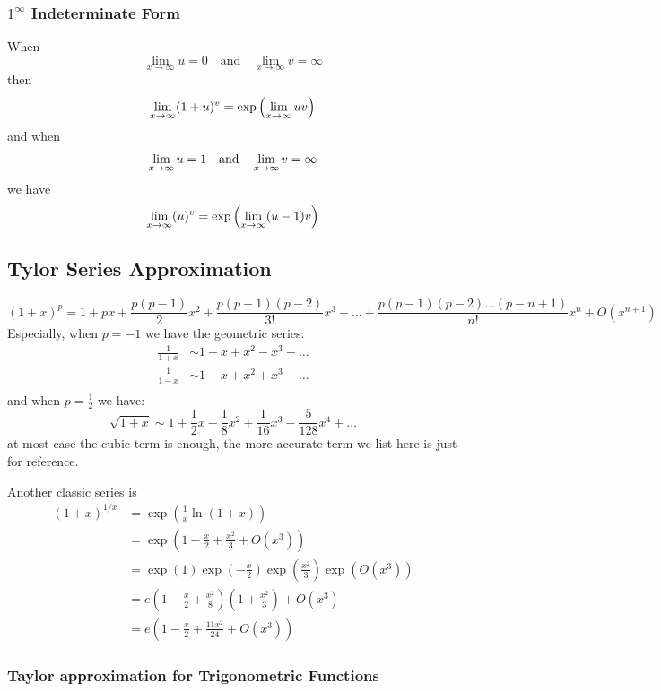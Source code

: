 \documentclass{overview}
\begin{document}
\subsubsection{$1^\infty$ Indeterminate Form}
When
 \[
	 \lim_{x \to \infty} u = 0 \quad \text{and} \quad
	 \lim_{x \to \infty} v = \infty
\] 
then
\[
	\lim_{x \to \infty}(1+u)^{v} = \exp\left({\lim_{x \to \infty} uv}\right)
\] 
and when
\[
	\lim_{x \to \infty} u = 1 \quad \text{and} \quad \lim_{x \to \infty} v = \infty
\] 
we have
\[
	\lim_{x \to \infty} (u)^{v} = \exp\left({\lim_{x \to \infty} (u-1)v}\right)
\] 
\subsection{Tylor Series Approximation}

\[
	(1+x)^{p} = 1 + px + \dfrac{p(p-1)}{2} x^2 + \dfrac{p(p-1)(p-2)}{3!} x^3
	+ \ldots + \dfrac{p(p-1)(p-2)\ldots (p-n+1)}{n!} x^n + O(x^{n+1})
\] 
Especially, when $p=-1$ we have the geometric series:
\[
\begin{aligned}
	\frac{1}{1+x} & \sim 1 - x + x^2 - x^3 + \ldots \\
	\frac{1}{1-x} & \sim 1 + x + x^2 + x^3 + \ldots \\
\end{aligned}
\] 
and when $p=\frac{1}{2}$ we have:
\[
	\sqrt{1+x} \sim 1 + \frac{1}{2} x - \frac{1}{8} x^2 + \frac{1}{16} x^3 
	- \frac{5}{128} x^4 + \ldots
\]
at most case the cubic term is enough, the more accurate term we list here
is just for reference.

Another classic series is 
\[
\begin{aligned}
	( {1 + x} )^{1/x}
	&= \exp \left( {\frac{1} {x}\ln ( {1 + x} )} \right) \\
	&= \exp \left( {1 - \frac{x} {2} + \frac{{x^{2} }} {3} + O( {x^{3} } )} \right) \\
  & = \exp(1)\exp \left( { - \frac{x} {2}} \right)\exp \left( {\frac{{x^{2} }}
{3}} \right)\exp ( {O( {x^{3} } )} ) \\
	&= e\left( {1 - \frac{x} {2} + \frac{{x^{2} }} {8}} \right)\left( {1 + \frac{{x^{2} }}
{3}} \right) + O\left( {x^{3} } \right) \\
	&= e\left( {1 - \frac{x} {2} + \frac{{11x^{2} }}
{{24}} + O( {x^{3} } )} \right) 
\end{aligned}
\] 


\subsubsection{Taylor approximation for Trigonometric Functions}
\end{document}
